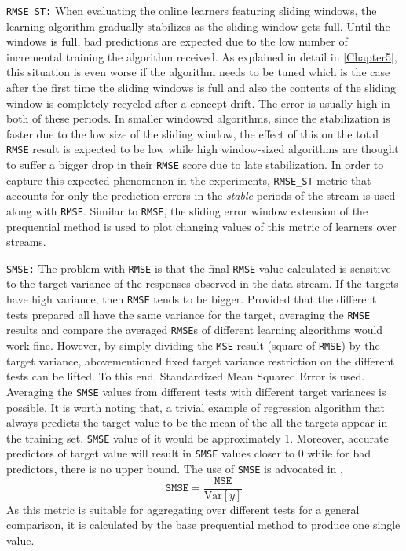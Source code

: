 \texttt{RMSE\_ST:} When evaluating the online learners featuring sliding windows, the learning algorithm gradually stabilizes as the sliding window gets full. Until the windows is full, bad predictions are expected due to the low number of incremental training the algorithm received. As explained in detail in \ref{Chapter5}, this situation is even worse if the algorithm needs to be tuned which is the case after the first time the sliding windows is full and also the contents of the sliding window is completely recycled after a concept drift. The error is usually high in both of these periods. In smaller windowed algorithms, since the stabilization is faster due to the low size of the sliding window, the effect of this on the total \texttt{RMSE} result is expected to be low while high window-sized algorithms are thought to suffer a bigger drop in their \texttt{RMSE} score due to late stabilization. In order to capture this expected phenomenon in the experiments, \texttt{RMSE\_ST} metric that accounts for only the prediction errors in the \textit{stable} periods of the stream is used along with \texttt{RMSE}. Similar to \texttt{RMSE}, the sliding error window extension of the prequential method is used to plot changing values of this metric of learners over streams.

\texttt{SMSE:} The problem with \texttt{RMSE} is that the final \texttt{RMSE} value calculated is sensitive to the target variance of the responses observed in the data stream. If the targets have high variance, then \texttt{RMSE} tends to be bigger. Provided that the different tests prepared all have the same variance for the target, averaging the \texttt{RMSE} results and compare the averaged \texttt{RMSE}s of different learning algorithms would work fine. However, by simply dividing the \texttt{MSE} result (square of \texttt{RMSE}) by the target variance, abovementioned fixed target variance restriction on the different tests can be lifted. To this end, Standardized Mean Squared Error is used. Averaging the \texttt{SMSE} values from different tests with different target variances is possible. It is worth noting that, a trivial example of regression algorithm that always predicts the target value to be the mean of the all the targets appear in the training set, \texttt{SMSE} value of it would be approximately 1. Moreover, accurate predictors of target value will result in \texttt{SMSE} values closer to 0 while for bad predictors, there is no upper bound. The use of \texttt{SMSE} is advocated in \cite[p. 23]{rasmussen_gaussian_2005}.
$$\texttt{SMSE} = \frac{\texttt{MSE}}{\text{Var}[y]}$$
As this metric is suitable for aggregating over different tests for a general comparison, it is calculated by the base prequential method to produce one single value.

